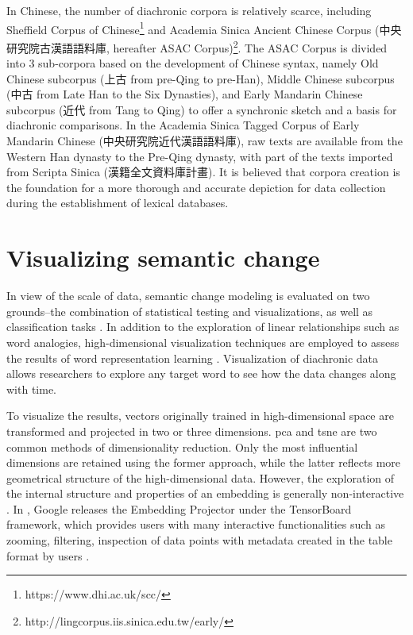 In Chinese, the number of diachronic corpora is relatively scarce, including Sheffield Corpus of Chinese\footnote{https://www.dhi.ac.uk/scc/} and Academia Sinica Ancient Chinese Corpus (中央研究院古漢語語料庫, hereafter ASAC Corpus)\footnote{http://lingcorpus.iis.sinica.edu.tw/early/}. The ASAC Corpus is divided into 3 sub-corpora based on the development of Chinese syntax, namely Old Chinese subcorpus (上古 from pre-Qing to pre-Han), Middle Chinese subcorpus (中古 from Late Han to the Six Dynasties), and Early Mandarin Chinese subcorpus (近代 from Tang to Qing) to offer a synchronic sketch and a basis for diachronic comparisons. In the Academia Sinica Tagged Corpus of Early Mandarin Chinese (中央研究院近代漢語語料庫), raw texts are available from the Western Han dynasty to the Pre-Qing dynasty, with part of the texts imported from Scripta Sinica (漢籍全文資料庫計畫). It is believed that corpora creation is the foundation for a more thorough and accurate depiction for data collection during the establishment of lexical databases.

\section{Visualizing semantic change}
In view of the scale of data, semantic change modeling is evaluated on two grounds--the combination of statistical testing and visualizations, as well as classification tasks \parencite{tang2018state}. In addition to the exploration of linear relationships such as word analogies, high-dimensional visualization techniques are employed to assess the results of word representation learning \parencite{liu2017visual}. Visualization of diachronic data allows researchers to explore any target word to see how the data changes along with time.

To visualize the results, vectors originally trained in high-dimensional space are transformed and projected in two or three dimensions. \gls{pca} and \gls{tsne} \parencite{vandermaaten2008tsne} are two common methods of dimensionality reduction. Only the most influential dimensions are retained using the former approach, while the latter reflects more geometrical structure of the high-dimensional data. However, the exploration of the internal structure and properties of an embedding is generally non-interactive \parencite{smilkov2016projector}. In \cite*{smilkov2016projector}, Google releases the Embedding Projector under the TensorBoard framework, which provides users with many interactive functionalities such as zooming, filtering, inspection of data points with metadata created in the table format by users \parencite{smilkov2016projector}.

